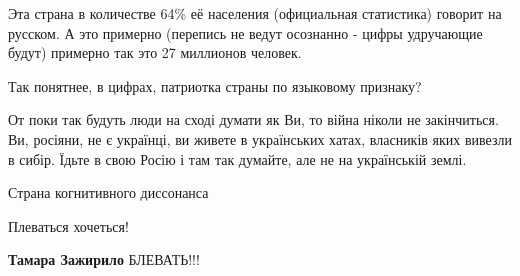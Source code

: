 \begin{itemize}
\begin{itemize}
\begin{itemize}
Эта страна в количестве 64\% её населения (официальная статистика) говорит на
русском. А это примерно (перепись не ведут осознанно - цифры удручающие будут)
примерно так это 27 миллионов человек.

Так понятнее, в цифрах, патриотка страны по языковому признаку?


От поки так будуть люди на сході думати як Ви, то війна ніколи не закінчиться.
Ви, росіяни, не є українці, ви живете в українських хатах, власників яких
вивезли в сибір. Їдьте в свою Росію і там так думайте, але не на українській
землі.

\end{itemize}

Страна когнитивного диссонанса

Плеваться хочеться!

\textbf{Тамара Зажирило}
БЛЕВАТЬ!!!

\end{itemize}

\end{itemize}
